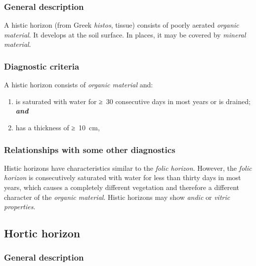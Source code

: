 \documentclass[
  letterpaper,
  DIV=11,
  numbers=noendperiod]{scrreprt}
\begin{document}
\hypertarget{general-description-14}{%
\subsubsection{General description}\label{general-description-14}}

A histic horizon (from Greek \emph{histos}, tissue) consists of poorly
aerated \emph{organic material}. It develops at the soil surface. In
places, it may be covered by \emph{mineral material}.

\hypertarget{diagnostic-criteria-14}{%
\subsubsection{Diagnostic criteria}\label{diagnostic-criteria-14}}

A histic horizon consists of \emph{organic material} and:

\begin{enumerate}
\def\labelenumi{\arabic{enumi}.}
\item
  is saturated with water for ≥~30 consecutive days in most years or is
  drained; \textbf{\emph{and}}
\item
  has a thickness of ≥~10~cm,
\end{enumerate}

\hypertarget{relationships-with-some-other-diagnostics-14}{%
\subsubsection{Relationships with some other
diagnostics}\label{relationships-with-some-other-diagnostics-14}}

Histic horizons have characteristics similar to the \emph{folic
horizon}. However, the \emph{folic horizon} is consecutively saturated
with water for less than thirty days in most years, which causes a
completely different vegetation and therefore a different character of
the \emph{organic material}. Histic horizons may show \emph{andic} or
\emph{vitric properties}.

\hypertarget{hortic-horizon}{%
\subsection{Hortic horizon}\label{hortic-horizon}}

\hypertarget{general-description-15}{%
\subsubsection{General description}\label{general-description-15}}
\end{document}
